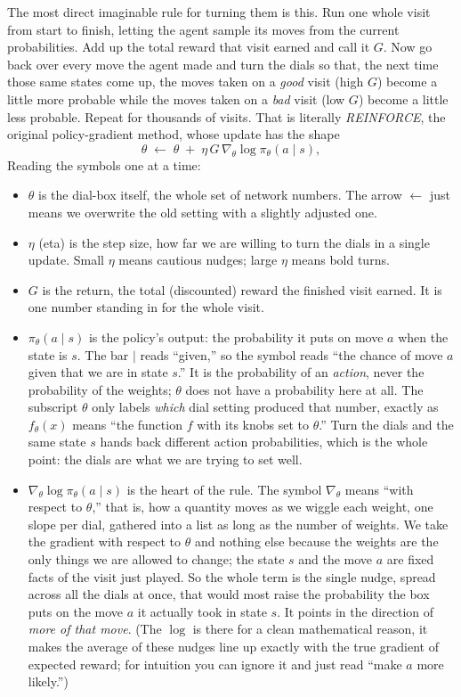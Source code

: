 \documentclass[11pt]{article}
\newcommand{\key}[1]{\textit{#1}}            %
\begin{document}
The most direct imaginable rule for turning them is this. Run one whole visit from start to
finish, letting the agent sample its moves from the current probabilities. Add up the total
reward that visit earned and call it $G$. Now go back over every move the agent made and turn
the dials so that, the next time those same states come up, the moves taken on a \emph{good}
visit (high $G$) become a little more probable while the moves taken on a \emph{bad} visit
(low $G$) become a little less probable. Repeat for thousands of visits. That is literally
\key{REINFORCE}, the original policy-gradient method, whose update has the shape
\begin{equation}
\theta \;\leftarrow\; \theta \;+\; \eta \, G \, \nabla_\theta \log \pi_\theta(a\mid s),
\label{eq:reinforce}
\end{equation}
Reading the symbols one at a time:
\begin{itemize}
\item $\theta$ is the dial-box itself, the whole set of network numbers. The arrow
$\leftarrow$ just means we overwrite the old setting with a slightly adjusted one.
\item $\eta$ (eta) is the step size, how far we are willing to turn the dials in a single
update. Small $\eta$ means cautious nudges; large $\eta$ means bold turns.
\item $G$ is the return, the total (discounted) reward the finished visit earned. It is one
number standing in for the whole visit.
\item $\pi_\theta(a\mid s)$ is the policy's output: the probability it puts on move $a$ when
the state is $s$. The bar $\mid$ reads ``given,'' so the symbol reads ``the chance of move
$a$ given that we are in state $s$.'' It is the probability of an \emph{action}, never the
probability of the weights; $\theta$ does not have a probability here at all. The
subscript $\theta$ only labels \emph{which} dial setting produced that number, exactly as
$f_\theta(x)$ means ``the function $f$ with its knobs set to $\theta$.'' Turn the dials and
the same state $s$ hands back different action probabilities, which is the whole point: the
dials are what we are trying to set well.
\item $\nabla_\theta \log \pi_\theta(a\mid s)$ is the heart of the rule. The symbol
$\nabla_\theta$ means ``with respect to $\theta$,'' that is, how a quantity moves as we wiggle
each weight, one slope per dial, gathered into a list as long as the number of weights. We
take the gradient with respect to $\theta$ and nothing else because the weights are the only
things we are allowed to change; the state $s$ and the move $a$ are fixed facts of the visit
just played. So the whole term is the single nudge, spread across all the dials at once, that
would most raise the probability the box puts on the move $a$ it actually took in state $s$.
It points in the direction of \emph{more of that move}. (The $\log$ is there for a clean
mathematical reason, it makes the average of these nudges line up exactly with the true
gradient of expected reward; for intuition you can ignore it and just read ``make $a$ more
likely.'')
\end{itemize}
\end{document}
